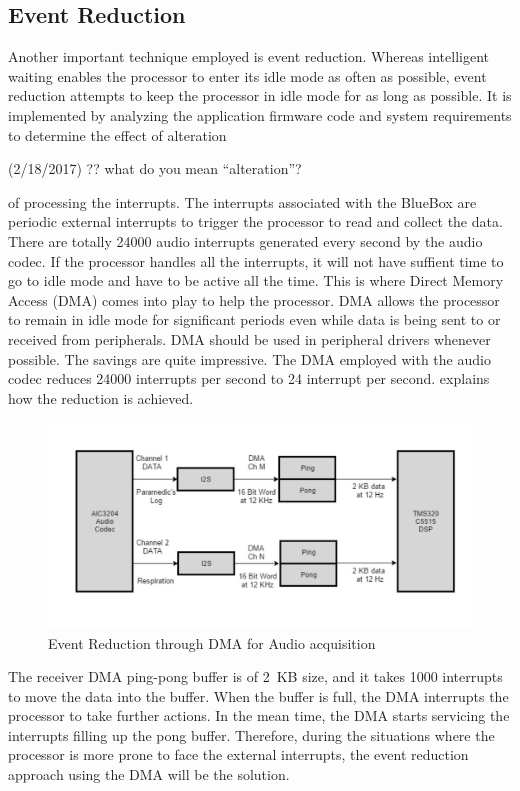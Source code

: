 \subsection{Event Reduction}

Another important technique employed is event reduction.  Whereas
intelligent waiting enables the processor to enter its idle mode as
often as possible, event reduction attempts to keep the processor in
idle mode for as long as possible. It is implemented by analyzing the
application firmware code and system requirements to determine the
effect of alteration
\begin{cmtPai}
	(2/18/2017) ?? what do you mean ``alteration''?
\end{cmtPai}
of processing the interrupts. The interrupts associated with the
BlueBox are periodic external interrupts to trigger the processor to
read and collect the data. There are totally 24000 audio interrupts
generated every second by the audio codec. If the processor handles
all the interrupts, it will not have suffient time to go to idle mode
and have to be active all the time. This is where Direct Memory
Access (DMA) comes into play to help the processor.  DMA allows the
processor to remain in idle mode for significant periods even while
data is being sent to or received from peripherals. DMA should be
used in peripheral drivers whenever possible. The savings are quite
impressive. The DMA employed with the audio codec reduces 24000
interrupts per second to 24 interrupt per second.
 explains how the reduction is achieved.

 \begin{figure}
	\centering
	\includegraphics[scale = 0.5 ]{Event_Reduction}
\caption{Event Reduction through DMA for Audio acquisition}
\label{event_reduction}
\end{figure}


The receiver DMA ping-pong buffer is of 2~KB size, and it takes 1000
interrupts to move the data into the buffer. When the buffer is full,
the DMA interrupts the processor to take further actions. In the mean
time, the DMA starts servicing the interrupts filling up the pong
buffer. Therefore, during the situations where the processor is more
prone to face the external interrupts, the event reduction approach
using the DMA will be the solution.
 
